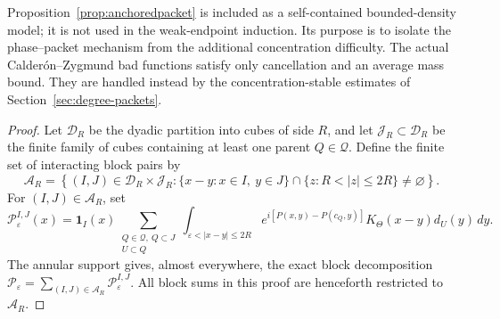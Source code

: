 \documentclass[11pt]{article}
\numberwithin{equation}{section}
\theoremstyle{remark}
\theoremstyle{definition}
\begin{document}
Proposition~\ref{prop:anchoredpacket} is included as a self-contained
bounded-density model; it is not used in the weak-endpoint induction.  Its
purpose is to isolate the phase--packet mechanism from the additional
concentration difficulty.  The actual Calder\'on--Zygmund bad functions
satisfy only cancellation and an average mass bound.  They are handled
instead by the concentration-stable estimates of
Section~\ref{sec:degree-packets}.

\begin{proof}
Let $\mathcal D_R$ be the dyadic partition into cubes of side $R$, and let
$\mathcal J_R\subset\mathcal D_R$ be the finite family of cubes containing
at least one parent $Q\in\mathcal Q$.  Define the finite set of interacting
block pairs by
\begin{equation}\label{eq:interacting-R-blocks}
 \mathcal A_R=\left\{(I,J)\in\mathcal D_R\times\mathcal J_R:
   \{x-y:x\in I,\ y\in J\}\cap\{z:R<|z|\le2R\}\ne\varnothing
                   \right\}.
\end{equation}
For $(I,J)\in\mathcal A_R$, set
\begin{equation}\label{eq:anchored-block-path}
 \mathcal P^{I,J}_\varepsilon(x)=\mathbf1_I(x)
 \sum_{\substack{Q\in\mathcal Q,\ Q\subset J\\U\subset Q}}
 \int_{\varepsilon<|x-y|\le2R}
 e^{i[P(x,y)-P(c_Q,y)]}K_\Theta(x-y)d_U(y)\,dy.
\end{equation}
The annular support gives, almost everywhere, the exact block decomposition
$\mathcal P_\varepsilon=\sum_{(I,J)\in\mathcal A_R}
\mathcal P^{I,J}_\varepsilon$.  All block sums in this proof are henceforth
restricted to $\mathcal A_R$.


\end{proof}
\end{document}
